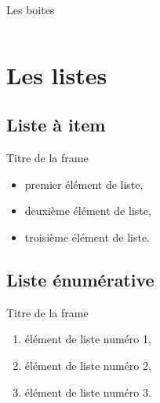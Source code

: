 \documentclass{bredelebeamer}
\begin{document}
\begin{frame}{Les boites}

\begin{columns}

\begin{column}{0.5\textwidth}


\end{column}

\begin{column}{0.5\textwidth}



\end{column}

\end{columns}


\end{frame}



\section{Les listes}
	\subsection{Liste à item}

\begin{frame}{Titre de la frame}

	\begin{itemize}
		\item premier élément de liste,
		\item deuxième élément de liste,
		\item troisième élément de liste.
	\end{itemize}
\end{frame} 

		\subsection{Liste énumérative} 
\begin{frame}{Titre de la frame} 
	\begin{enumerate}
		\item élément de liste numéro 1,
		\item élément de liste numéro 2,
		\item élément de liste numéro 3.  
	\end{enumerate}
\end{frame}
\end{document}
